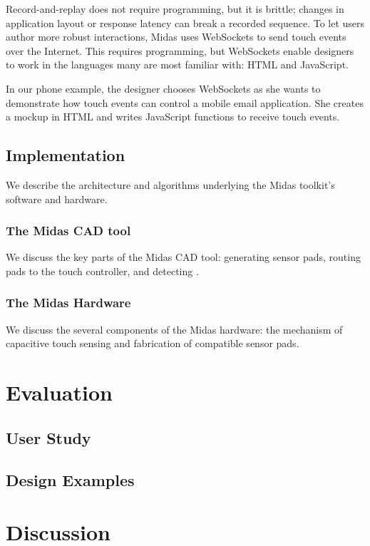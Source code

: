 Record-and-replay does not require programming, but it is
brittle; changes in application layout or response latency can
break a recorded sequence. To let users author more robust
interactions, Midas uses WebSockets to send touch events
over the Internet. This requires programming, but WebSockets
enable designers to work in the languages many are most
familiar with: HTML and JavaScript.

In our phone example, the designer chooses WebSockets as
she wants to demonstrate how touch events can control a mobile
email application. She creates a mockup in HTML and
writes JavaScript functions to receive touch events.

\subsection{Implementation}

We describe the architecture and algorithms underlying the Midas toolkit's software and hardware.

\subsubsection{The Midas CAD tool}

We discuss the key parts of the Midas CAD tool: generating sensor pads, routing pads to the touch controller, and detecting .

\subsubsection{The Midas Hardware}

We discuss the several components of the Midas hardware: the mechanism of capacitive touch sensing and fabrication of compatible sensor pads.

\section{Evaluation}

\subsection{User Study}

\subsection{Design Examples}

\section{Discussion}


